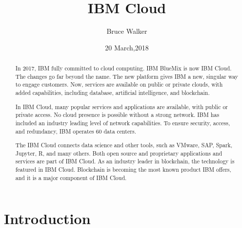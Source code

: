 
\title{IBM Cloud}

\author{Bruce Walker}

\date{20 March,2018}


\maketitle
\begin{abstract}

  In 2017, IBM fully committed to cloud computing. IBM BlueMix is now
  IBM Cloud. The changes go far beyond the name. The new platform
  gives IBM a new, singular way to engage customers. Now, services are
  available on public or private clouds, with added capabilities,
  including database, artificial intelligence, and blockchain.

  In IBM Cloud, many popular services and applications are available,
  with public or private access. No cloud presence is possible without
  a strong network. IBM has included an industry leading level of
  network capabilities. To ensure security, access, and redundancy,
  IBM operates 60 data centers.

  The IBM Cloud connects data science and other tools, such as VMware,
  SAP, Spark, Jupyter, R, and many others. Both open source and
  proprietary applications and services are part of IBM Cloud. As an
  industry leader in blockchain, the technology is featured in IBM
  Cloud. Blockchain is becoming the most known product IBM offers, and
  it is a major component of IBM Cloud. \end{abstract}




\section{Introduction}

